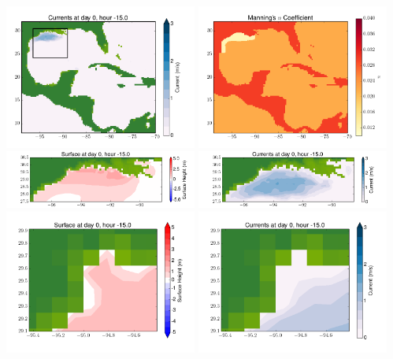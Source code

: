 \documentclass[11pt]{article}
\begin{document}
\includegraphics[width=0.475\textwidth]{frame0057fig2.png}
\vskip 10pt 
\includegraphics[width=0.475\textwidth]{frame0057fig3.png}
\includegraphics[width=0.475\textwidth]{frame0057fig4.png}
\vskip 10pt 
\includegraphics[width=0.475\textwidth]{frame0057fig5.png}
\includegraphics[width=0.475\textwidth]{frame0057fig6.png}
\vskip 10pt 
\includegraphics[width=0.475\textwidth]{frame0057fig7.png}
\end{document}
